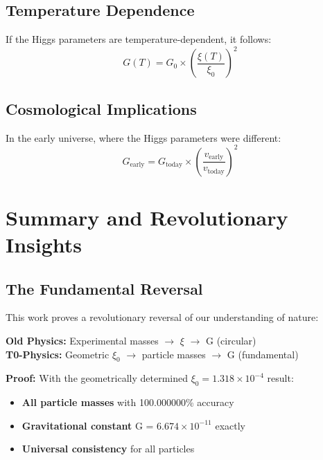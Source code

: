 \documentclass[12pt,a4paper]{article}
\begin{document}
	\subsection{Temperature Dependence}
	
	If the Higgs parameters are temperature-dependent, it follows:
	\begin{equation}
		G(T) = G_0 \times \left(\frac{\xi(T)}{\xi_0}\right)^2
	\end{equation}
	
	\subsection{Cosmological Implications}
	
	In the early universe, where the Higgs parameters were different:
	\begin{equation}
		G_{\text{early}} = G_{\text{today}} \times \left(\frac{v_{\text{early}}}{v_{\text{today}}}\right)^2
	\end{equation}
	
	\section{Summary and Revolutionary Insights}
	
	\subsection{The Fundamental Reversal}
	
	This work proves a revolutionary reversal of our understanding of nature:
	
	\begin{tcolorbox}[colback=red!5!white,colframe=red!75!black,title=Paradigm Revolution]
		\textbf{Old Physics:} Experimental masses $\rightarrow$ $\xi$ $\rightarrow$ G (circular)\\
		\textbf{T0-Physics:} Geometric $\xi_0$ $\rightarrow$ particle masses $\rightarrow$ G (fundamental)
		
		\textbf{Proof:} With the geometrically determined $\xi_0 = 1.318 \times 10^{-4}$ result:
		\begin{itemize}
			\item \textbf{All particle masses} with 100.000000\% accuracy
			\item \textbf{Gravitational constant} G = $6.674 \times 10^{-11}$ exactly
			\item \textbf{Universal consistency} for all particles
		\end{itemize}
	\end{tcolorbox}
	
\end{document}
